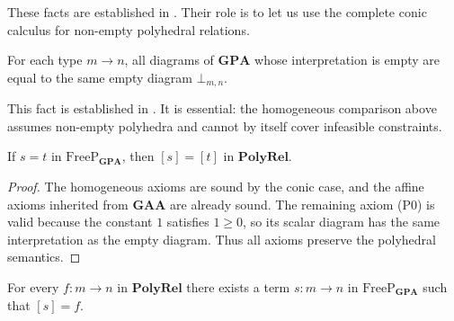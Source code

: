 These facts are established in
\cite[Lemma~25 and Theorem~26]{bonchi2021polyhedral}.
Their role is to let us use the complete conic calculus for non-empty
polyhedral relations.

\begin{lemma}\label{lem:gpa-empty-form}
    For each type $m\to n$, all diagrams of $\mathbf{GPA}$ whose
    interpretation is empty are equal to the same empty diagram
    $\bot_{m,n}$.
\end{lemma}

This fact is established in \cite[Theorem~27]{bonchi2021polyhedral}.
It is essential: the homogeneous comparison above assumes non-empty
polyhedra and cannot by itself cover infeasible constraints.


\begin{lemma}[Soundness]
    If $s=t$ in $\mathrm{FreeP}_{\mathbf{GPA}}$, then
    $[s]=[t]$ in $\mathbf{PolyRel}$.
\end{lemma}

\begin{proof}
    The homogeneous axioms are sound by the conic case, and the affine
    axioms inherited from $\mathbf{GAA}$ are already sound.
    The remaining axiom (P0) is valid because the constant $1$ satisfies
    $1\ge0$, so its scalar diagram has the same interpretation as the
    empty diagram. Thus all axioms preserve the polyhedral semantics.
\end{proof}

\begin{lemma}[Expressivity]
    For every $f:m\to n$ in $\mathbf{PolyRel}$ there exists a term
    $s:m\to n$ in $\mathrm{FreeP}_{\mathbf{GPA}}$ such that $[s]=f$.
\end{lemma}

